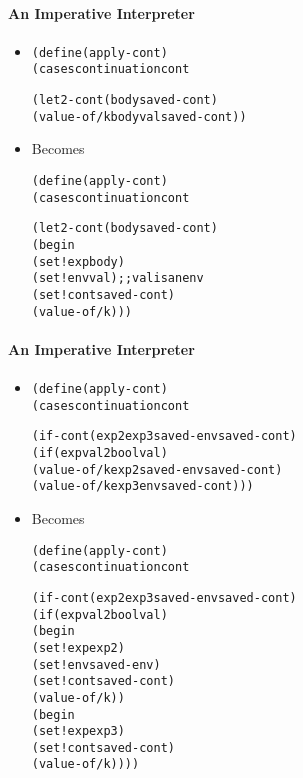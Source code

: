 \documentclass{beamer}
\begin{document}
\begin{frame}[fragile]
\framesubtitle{An Imperative Interpreter}
\begin{scriptsize}
\begin{itemize}
\item<1->
\begin{alltt}
(define (apply-cont)
  (cases continuation cont
    
    (let2-cont (body saved-cont)
               (value-of/k body val saved-cont))
\end{alltt}

\item<1-> Becomes
\begin{alltt}
(define (apply-cont)
  (cases continuation cont
    
    (let2-cont (body saved-cont)
               (begin
                 (set! exp body)
                 (set! env val) ;; val is an env
                 (set! cont saved-cont)
                 (value-of/k)))
\end{alltt}

\end{itemize}
\end{scriptsize}
\end{frame}

\begin{frame}[fragile]
\framesubtitle{An Imperative Interpreter}
\begin{scriptsize}
\begin{itemize}
\item<1->
\begin{alltt}
(define (apply-cont)
  (cases continuation cont

    (if-cont (exp2 exp3 saved-env saved-cont)
             (if (expval2bool val)
                 (value-of/k exp2 saved-env saved-cont)
                 (value-of/k exp3 env saved-cont)))
\end{alltt}

\item<1-> Becomes
\begin{alltt}
(define (apply-cont)
  (cases continuation cont
    
    (if-cont (exp2 exp3 saved-env saved-cont)
             (if (expval2bool val)
                 (begin
                   (set! exp exp2)
                   (set! env saved-env)
                   (set! cont saved-cont)
                   (value-of/k))
                 (begin
                   (set! exp exp3)
                   (set! cont saved-cont)
                   (value-of/k))))
\end{alltt}

\end{itemize}
\end{scriptsize}
\end{frame}
\end{document}

